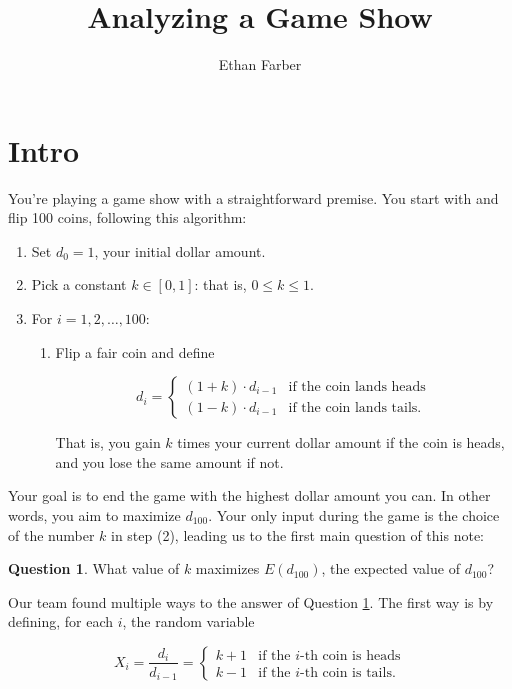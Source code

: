 \documentclass[12pt, oneside]{book}
\title{Analyzing a Game Show}
\author{Ethan Farber}
\theoremstyle{plain}
\theoremstyle{definition}
\newtheorem{question}[thm]{Question}
\begin{document}
\newpage

\maketitle


\section{Intro}

You're playing a game show with a straightforward premise. You start with  and flip 100 coins, following this algorithm:

\begin{enumerate}
\item Set $d_0=1$, your initial dollar amount.
\item Pick a constant $k \in [0,1]$: that is, $0 \leq k \leq 1$.
\item For $i=1, 2, \ldots, 100$:
\begin{enumerate}
\item Flip a fair coin and define

\[
d_i=
\begin{cases}
(1+k) \cdot d_{i-1} & \text{if the coin lands heads}\\
(1-k) \cdot d_{i-1} & \text{if the coin lands tails.}
\end{cases}
\]

That is, you gain $k$ times your current dollar amount if the coin is heads, and you lose the same amount if not.
\end{enumerate}
\end{enumerate}

Your goal is to end the game with the highest dollar amount you can. In other words, you aim to maximize $d_{100}$. Your only input during the game is the choice of the number $k$ in step (2), leading us to the first main question of this note:

\begin{question}\label{question:expect1}
What value of $k$ maximizes $E(d_{100})$, the expected value of $d_{100}$?
\end{question}

Our team found multiple ways to the answer of Question \ref{question:expect1}. The first way is by defining, for each $i$, the random variable

\[
X_i = \frac{d_i}{d_{i-1}} = \begin{cases}
k+1 & \text{if the $i$-th coin is heads}\\
k-1 & \text{if the $i$-th coin is tails.}
\end{cases}
\]
\end{document}
